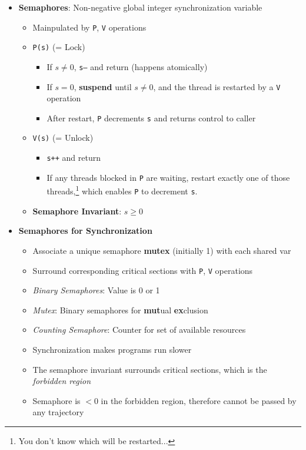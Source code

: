 \documentclass[12pt]{article}
\begin{document}
{\begin{itemize}
\begin{itemize}
	\end{itemize}
	\item \textbf{Semaphores}: Non-negative global integer synchronization variable
	\begin{itemize}
		\item Mainpulated by \texttt{P}, \texttt{V} operations
		\item \texttt{P(s)} (= Lock)
		\begin{itemize}
			\item If $s\neq 0$, \texttt{s--} and return (happens atomically)
			\item If $s=0$, \textbf{suspend} until $s\neq 0$, and the thread is restarted by a \texttt{V} operation
			\item After restart, \texttt{P} decrements \texttt{s} and returns control to caller
		\end{itemize}
		\item \texttt{V(s)} (= Unlock)
		\begin{itemize}
			\item \texttt{s++} and return
			\item If any threads blocked in \texttt{P} are waiting, restart exactly one of those threads,\footnote{You don't know which will be restarted...} which enables \texttt{P} to decrement \texttt{s}.
		\end{itemize}
		\item \textbf{Semaphore Invariant}: $s\geq 0$
	\end{itemize}
	\item \textbf{Semaphores for Synchronization}
	\begin{itemize}
		\item Associate a unique semaphore \textbf{mutex} (initially 1) with each shared var
		\item Surround corresponding critical sections with \texttt{P}, \texttt{V} operations
		\item \textit{Binary Semaphores}: Value is 0 or 1
		\item \textit{Mutex}: Binary semaphores for \textbf{mut}ual \textbf{ex}clusion
		\item \textit{Counting Semaphore}: Counter for set of available resources
		\item Synchronization makes programs run slower
		\item The semaphore invariant surrounds critical sections, which is the \textit{forbidden region}
		\item Semaphore is $<0$ in the forbidden region, therefore cannot be passed by any trajectory

\end{itemize}
\end{itemize}}
\end{document}
